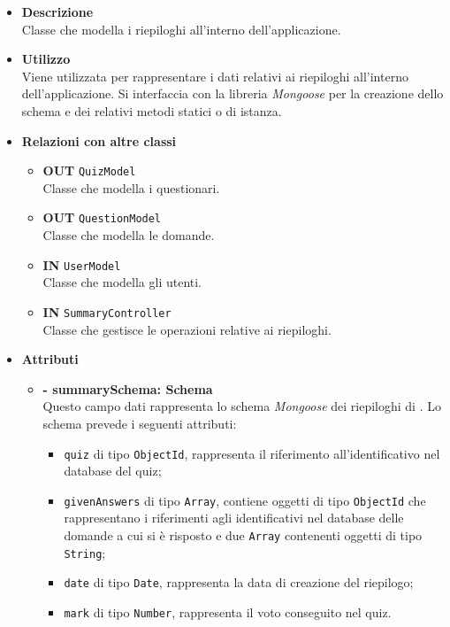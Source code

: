 \begin{itemize}
	\item \textbf{Descrizione} \\
	Classe che modella i riepiloghi all'interno dell'applicazione.
	\item \textbf{Utilizzo} \\
	Viene utilizzata per rappresentare i dati relativi ai riepiloghi all'interno dell'applicazione. Si interfaccia con la libreria \textit{Mongoose} per la creazione dello schema e dei relativi metodi statici o di istanza.
	\item \textbf{Relazioni con altre classi}
		\begin{itemize}
			\item \textbf{OUT} \texttt{QuizModel}\\
			Classe che modella i questionari.
			\item \textbf{OUT} \texttt{QuestionModel}\\
			Classe che modella le domande.
			\item \textbf{IN} \texttt{UserModel}\\
			Classe che modella gli utenti.
			\item \textbf{IN} \texttt{SummaryController}\\
			Classe che gestisce le operazioni relative ai riepiloghi.
		\end{itemize}
	\item \textbf{Attributi}
		\begin{itemize}
			\item \textbf{- summarySchema: Schema} \\
			Questo campo dati rappresenta lo schema \textit{Mongoose} dei riepiloghi di \progetto. Lo schema prevede i seguenti attributi:
				\begin{itemize}
					\item \texttt{quiz} di tipo \texttt{ObjectId}, rappresenta il riferimento all'identificativo nel database del quiz;
					\item \texttt{givenAnswers} di tipo \texttt{Array}, contiene oggetti di tipo \texttt{ObjectId} che rappresentano i riferimenti agli identificativi nel database delle domande a cui si è risposto e due \texttt{Array} contenenti oggetti di tipo \texttt{String};	
					\item \texttt{date} di tipo \texttt{Date}, rappresenta la data di creazione del riepilogo;
					\item \texttt{mark} di tipo \texttt{Number}, rappresenta il voto conseguito nel quiz.

\end{itemize}
\end{itemize}
\end{itemize}
